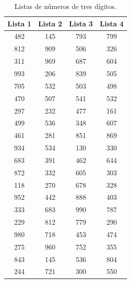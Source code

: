 \begin{ejercicio}[Tipo 1]
\begin{table}[H]
  \centering
  \caption{Listas de números de tres dígitos.}
  \label{tab:listas}
  \begin{tabular}{cccc}
    \toprule
    Lista 1 & Lista 2 & Lista 3 & Lista 4 \\
    \midrule
    482 & 145 & 793 & 799 \\
    812 & 909 & 506 & 326 \\
    311 & 969 & 687 & 604 \\
    993 & 206 & 839 & 505 \\
    705 & 532 & 503 & 498 \\
    470 & 507 & 541 & 532 \\
    297 & 232 & 477 & 161 \\
    499 & 536 & 348 & 607 \\
    461 & 281 & 851 & 869 \\
    934 & 534 & 130 & 330 \\
    683 & 391 & 462 & 644 \\
    872 & 332 & 605 & 303 \\
    118 & 270 & 678 & 328 \\
    952 & 442 & 888 & 403 \\
    333 & 683 & 990 & 787 \\
    229 & 812 & 779 & 290 \\
    980 & 718 & 453 & 474 \\
    275 & 960 & 752 & 355 \\
    843 & 145 & 536 & 804 \\
    244 & 721 & 300 & 550 \\
    \bottomrule
  \end{tabular}
\end{table}
\end{ejercicio}

